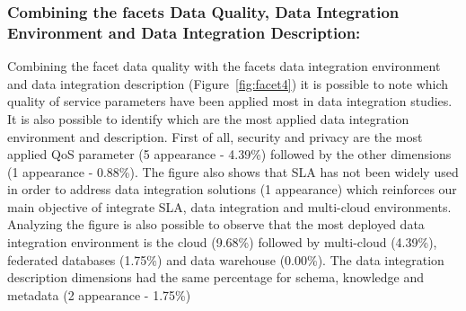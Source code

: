  
% 
% 

\subsubsection{Combining the facets Data Quality, Data Integration Environment
and Data Integration Description:}

Combining the facet data quality with the facets data integration environment and data integration description
(Figure~\ref{fig:facet4}) it is possible to note which quality of service parameters have been applied most in
data integration studies.
It is also possible to identify which are the most applied data integration environment and description.
First of all, security and privacy are the most applied QoS parameter (5 appearance - 4.39\%)
followed by the other dimensions (1 appearance - 0.88\%). 
The figure also shows that SLA has not been widely used in order to address data integration solutions
(1 appearance) which reinforces our main objective of integrate SLA, data integration and multi-cloud 
environments. 
Analyzing the figure is also possible to observe that the most deployed data integration environment is 
the cloud (9.68\%) followed by multi-cloud (4.39\%), federated databases (1.75\%) and data warehouse (0.00\%).
The data integration description dimensions had the same percentage for schema, knowledge and metadata (2 appearance - 1.75\%)

